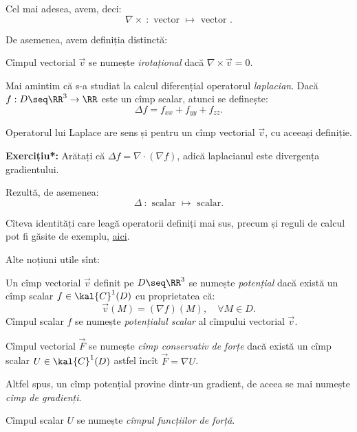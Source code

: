 Cel mai adesea, avem, deci:
\[
  \nabla \times \ : \text{ vector } \mapsto \text{ vector }.
\]

De asemenea, avem definiția distinctă:
\begin{definition}\label{def:irot}
  Cîmpul vectorial $ \vec{v} $ se numește \emph{irotațional} dacă $ \nabla \times \vec{v} = 0 $.
\end{definition}

Mai amintim că s-a studiat la calcul diferențial operatorul \emph{laplacian}. Dacă
$ f : D \seq \RR^3 \to \RR $ este un cîmp scalar, atunci se definește:
\[
  \Delta f = f_{xx} + f_{yy} + f_{zz}.
\]

\begin{remark}\label{rk:lapl-vec}
  Operatorul lui Laplace are sens și pentru un cîmp vectorial $ \vec{v} $, cu aceeași
  definiție.
\end{remark}

\textbf{Exercițiu*:} Arătați că $ \Delta f = \nabla \cdot (\nabla f) $, adică
laplacianul este divergența gradientului.

Rezultă, de asemenea:
\[
  \Delta \ : \text{ scalar } \mapsto \text{ scalar}.
\]

\vspace{1cm}

Cîteva identități care leagă operatorii definiți mai sus, precum și reguli de
calcul pot fi găsite de exemplu, \href{https://en.wikipedia.org/wiki/Vector\_calculus\_identities#Properties}{aici}.

\vspace{1cm}

Alte noțiuni utile sînt:
\begin{definition}\label{def:pot}
  Un cîmp vectorial $\vec{v} $ definit pe $ D \seq \RR^3 $ se numește \emph{potențial} dacă
  există un cîmp scalar $ f \in \kal{C}^1(D)$ cu proprietatea că:
  \[
    \vec{v}(M) = (\nabla f)(M), \quad \forall M \in D.
  \]
  Cîmpul scalar $ f $ se numește \emph{potențialul scalar} al cîmpului vectorial $ \vec{v} $.
\end{definition}

\begin{definition}\label{def:cons-forte}
  Cîmpul vectorial $ \vec{F} $ se numește \emph{cîmp conservativ de forțe} dacă
  există un cîmp scalar $ U \in \kal{C}^1(D) $ astfel încît $ \vec{F} = \nabla U $.

  Altfel spus, un cîmp potențial provine dintr-un gradient, de aceea se mai numește
  \emph{cîmp de gradienți}.

  Cîmpul scalar $ U $ se numește \emph{cîmpul funcțiilor de forță}.
\end{definition}

